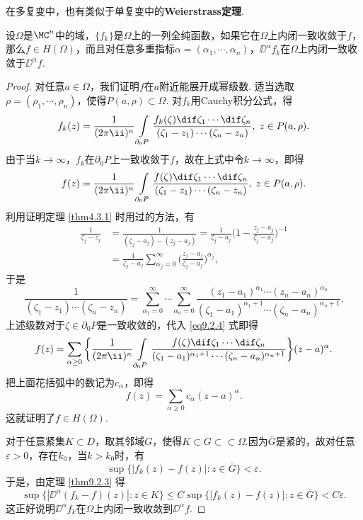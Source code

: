 在多复变中，也有类似于单复变中的\textbf{Weierstrass定理}.
\begin{theorem}\label{thm9.2.4}
设$\Omega$是$\MC^n$中的域，$\{f_k\}$是$\Omega$上的一列全纯函数，如果它在$\Omega$上内闭一致收敛于$f$，那么$f\in H(\Omega)$，而且对任意多重指标$\alpha=(\alpha_1,\cdots,\alpha_n)$，$\DD^\alpha f_k$在$\Omega$上内闭一致收敛于$\DD^\alpha f$.
\end{theorem}
\begin{proof}
对任意$a\in\Omega$，我们证明$f$在$a$附近能展开成幂级数. 适当选取$\rho=(\rho_1,\cdots,\rho_n)$，使得$\bar{P(a,\rho)}\subset\Omega$. 对$f_k$用Cauchy积分公式，得
\[f_k(z)=\frac1{(2\pi\ii)^n}\int\limits_{\partial_0P}\frac{f_k(\zeta)\dif \zeta_1\cdots\dif \zeta_n}{(\zeta_1-z_1)\cdots(\zeta_n-z_n)},\;z\in P(a,\rho).\]
由于当$k\to\infty$，$f_k$在$\partial_0P$上一致收敛于$f$，故在上式中令$k\to\infty$，即得
\begin{equation}\label{eq9.2.4}
f(z)=\frac1{(2\pi\ii)^n}\int\limits_{\partial_0P}\frac{f(\zeta)\dif \zeta_1\cdots\dif \zeta_n}{(\zeta_1-z_1)\cdots(\zeta_n-z_n)},\;z\in P(a,\rho).
\end{equation}
利用证明定理 \ref{thm4.3.1} 时用过的方法，有
\begin{align*}
\frac1{\zeta_j-z_j}&=\frac1{(\zeta_j-a_j)-(z_j-a_j)}
=\frac1{\zeta_j-a_j}\bigg(1-\frac{z_j-a_j}{\zeta_j-a_j}\bigg)^{-1}\\
&=\frac1{\zeta_j-a_j}\sum_{\alpha_j=0}^\infty\bigg(\frac{z_j-a_j}{\zeta_j-a_j}\bigg)
^{\alpha_j},
\end{align*}
于是
\[\frac1{(\zeta_1-z_1)\cdots(\zeta_n-z_n)}=\sum_{\alpha_1=0}^\infty\cdots
\sum_{\alpha_n=0}^\infty\frac{(z_1-a_1)^{\alpha_1}\cdots(z_n-a_n)^{\alpha_n}}
{(\zeta_1-a_1)^{\alpha_1+1}\cdots(\zeta_n-a_n)^{\alpha_n+1}}.\]
上述级数对于$\zeta\in\partial_0P$是一致收敛的，代入 \eqref{eq9.2.4} 式即得
\[f(z)=\sum_{\alpha\ge0}\bigg\{\frac1{(2\pi\ii)^n}\int\limits_{\partial_0P}
\frac{f(\zeta)\dif \zeta_1\cdots\dif \zeta_n}
{(\zeta_1-a_1)^{\alpha_1+1}\cdots(\zeta_n-a_n)^{\alpha_n+1}}\bigg\}(z-a)^\alpha.\]
把上面花括弧中的数记为$c_\alpha$，即得
\[f(z)=\sum_{\alpha\ge0}c_\alpha(z-a)^\alpha.\]
这就证明了$f\in H(\Omega)$.

对于任意紧集$K\subset D$，取其邻域$G$，使得$K\subset G\subset\subset \Omega$.因为$\bar G$是紧的，故对任意$\varepsilon>0$，存在$k_0$，当$k>k_0$时，有
\[\sup\{|f_k(z)-f(z)|:z\in\bar G\}<\varepsilon.\]
于是，由定理 \ref{thm9.2.3} 得
\[\sup\{|\DD^\alpha(f_k-f)(z)|:z\in K\}\le C\sup\{|f_k(z)-f(z)|:z\in\bar G\}
<C\varepsilon.\]
这正好说明$\DD^\alpha f_k$在$\Omega$上内闭一致收敛到$\DD^\alpha f$.
\end{proof}

